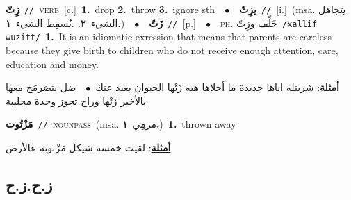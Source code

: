 \documentclass[10pt,a4paper,twoside]{article} %
\begin{document}
\begin{multicols}{2}
{{{{{{{{\setlength\topsep{0pt}\textbf{\foreignlanguage{arabic}{زِتّ}}\ {\color{gray}\texttt{//}\color{black}}\ \textsc{verb}\ [c.]\ \textbf{1.}~drop  \textbf{2.}~throw  \textbf{3.}~ignore sth\ \ $\bullet$\ \ \setlength\topsep{0pt}\textbf{\foreignlanguage{arabic}{يزِتّ}}\ {\color{gray}\texttt{//}\color{black}}\ [i.]\ \color{gray}(msa. \foreignlanguage{arabic}{يتجاهل الشيء}~\foreignlanguage{arabic}{\textbf{٢.}}  .\foreignlanguage{arabic}{يُسقِط الشيء}~\foreignlanguage{arabic}{\textbf{١.}})\color{black}\ \ $\bullet$\ \ \setlength\topsep{0pt}\textbf{\foreignlanguage{arabic}{زَتّ}}\ {\color{gray}\texttt{//}\color{black}}\ [p.]\ \ $\bullet$\ \ \textsc{ph.} \color{gray} \foreignlanguage{arabic}{خَلِّف وزِتّ}\color{black}\ {\color{gray}\texttt{/{\sffamily xallif wuzitt}/}\color{black}}\ \textbf{1.}~It is an idiomatic exression that means that parents are careless because they give birth to children who do not receive enough attention, care, education and money.\  \begin{flushright}\color{gray}\foreignlanguage{arabic}{\textbf{\underline{\foreignlanguage{arabic}{أمثلة}}}: شريتله اياها جديدة ما أحلاها هيه زَتْها الحيوان بعيد عنك\ $\bullet$\ \  ضل يتصَرمَح معها بالأخير زَتْها وراح تجوز وحدة مجلببة}\end{flushright}\color{black}} \vspace{2mm}

{\setlength\topsep{0pt}\textbf{\foreignlanguage{arabic}{مَزْتُوت}}\ {\color{gray}\texttt{//}\color{black}}\ \textsc{noun\textunderscore pass}\ \color{gray}(msa. \foreignlanguage{arabic}{مرمِي}~\foreignlanguage{arabic}{\textbf{١.}})\color{black}\ \textbf{1.}~thrown away\  \begin{flushright}\color{gray}\foreignlanguage{arabic}{\textbf{\underline{\foreignlanguage{arabic}{أمثلة}}}: لقيت خمسة شيكل مَزْتوتِة عالأرض}\end{flushright}\color{black}} \vspace{2mm}

\vspace{-3mm}
\subsection*{\color{blue}\foreignlanguage{arabic}{ز.ح.ز.ح}\color{blue}{}} 

}}}}}}}
\end{multicols}
\end{document}
